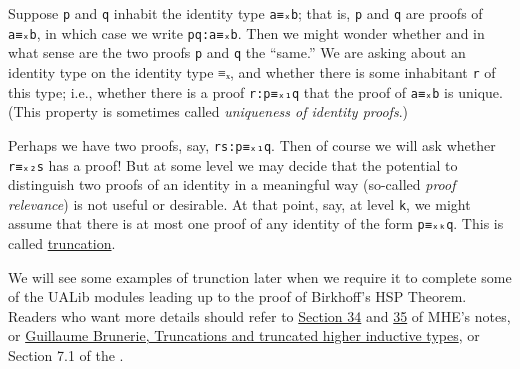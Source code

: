 \begin{code}
Suppose \texttt{p} and \texttt{q} inhabit the identity type \texttt{a≡ₓb}; that is, \texttt{p} and \texttt{q} are proofs of \texttt{a≡ₓb}, in which case we write \texttt{pq:a≡ₓb}. Then we might wonder whether and in what sense are the two proofs \texttt{p} and \texttt{q} the ``same.'' We are asking about an identity type on the identity type ≡ₓ, and whether there is some inhabitant \texttt{r} of this type; i.e., whether there is a proof \texttt{r:p≡ₓ₁q} that the proof of \texttt{a≡ₓb} is unique. (This property is sometimes called \emph{uniqueness of identity proofs}.)

Perhaps we have two proofs, say, \texttt{rs:p≡ₓ₁q}. Then of course we will ask whether \texttt{r≡ₓ₂s} has a proof! But at some level we may decide that the potential to distinguish two proofs of an identity in a meaningful way (so-called \emph{proof relevance}) is not useful or desirable. At that point, say, at level \texttt{k}, we might assume that there is at most one proof of any identity of the form \texttt{p≡ₓₖq}. This is called \href{https://www.cs.bham.ac.uk/~mhe/HoTT-UF-in-Agda-Lecture-Notes/HoTT-UF-Agda.html\#truncation}{truncation}.

We will see some examples of trunction later when we require it to complete some of the UALib modules leading up to the proof of Birkhoff's HSP Theorem. Readers who want more details should refer to \href{https://www.cs.bham.ac.uk/~mhe/HoTT-UF-in-Agda-Lecture-Notes/HoTT-UF-Agda.html\#truncation}{Section 34} and \href{https://www.cs.bham.ac.uk/~mhe/HoTT-UF-in-Agda-Lecture-Notes/HoTT-UF-Agda.html\#resizing}{35} of MHE's notes, or \href{https://homotopytypetheory.org/2012/09/16/truncations-and-truncated-higher-inductive-types/}{Guillaume Brunerie, Truncations and truncated higher inductive types}, or Section 7.1 of the \hottbook.


\end{code}
